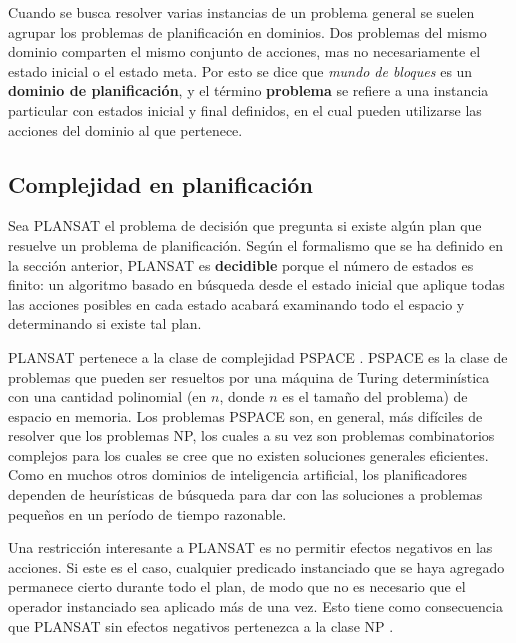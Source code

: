 Cuando se busca resolver varias instancias de un problema general se suelen
agrupar los problemas de planificación en dominios. Dos problemas del mismo
dominio comparten el mismo conjunto de acciones, mas no necesariamente el
estado inicial o el estado meta. Por esto se dice que \textit{mundo de bloques}
es un \textbf{dominio de planificación}, y el término \textbf{problema} se refiere a
una instancia particular con estados inicial y final definidos, en
el cual pueden utilizarse las acciones del dominio al que pertenece.

\subsection{Complejidad en planificación}
Sea PLANSAT el problema de decisión que pregunta si existe algún plan que
resuelve un problema de planificación. Según el formalismo que se ha definido
en la sección anterior,
PLANSAT es \textbf{decidible} porque el número de estados es finito:
un algoritmo basado en búsqueda desde el estado inicial que aplique
todas las acciones posibles en cada estado acabará examinando todo el espacio y
determinando si existe tal plan.

PLANSAT pertenece a la clase de complejidad PSPACE \cite{ghallab:book}.
PSPACE es la clase de problemas que pueden ser resueltos por una máquina de
Turing determinística con una cantidad polinomial (en $n$, donde $n$ es el
tamaño del problema) de espacio en memoria. Los problemas PSPACE son, en
general, más difíciles de resolver que los problemas NP, los cuales a su vez
son problemas combinatorios complejos para los cuales se cree que no existen
soluciones generales eficientes. Como en muchos otros dominios de inteligencia
artificial, los planificadores dependen de
heurísticas de búsqueda para dar con las soluciones a problemas pequeños en un 
período de tiempo razonable.

Una restricción interesante a PLANSAT es no permitir efectos negativos en las
acciones. Si este es el caso, cualquier predicado instanciado que se haya 
agregado permanece cierto durante todo el plan, de modo que no es necesario
que el operador instanciado sea aplicado más de una vez.
Esto tiene como consecuencia que PLANSAT sin efectos 
negativos pertenezca a la clase NP \cite{ghallab:book}.

